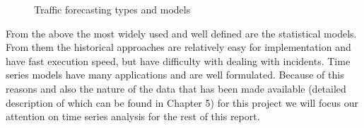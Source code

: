 \begin{figure}[ht]
	\caption{Traffic forecasting types and models \cite{youKim}}
	\label{fig:modelsProsCons}
\end{figure}


From the above the most widely used and well defined are the statistical models. From them the historical approaches are relatively easy for implementation and have fast execution speed, but have difficulty with dealing with incidents. Time series models have many applications and are well formulated. Because of this reasons and also the nature of the data that has been made available (detailed description of which can be found in Chapter 5) for this project we will focus our attention on time series analysis for the rest of this report.

